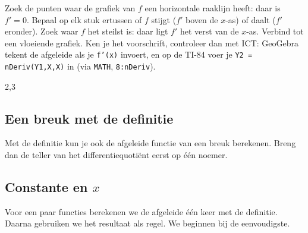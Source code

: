 \begin{werkwijze}
Zoek de punten waar de grafiek van $f$ een horizontale raaklijn heeft: daar is $f' = 0$. Bepaal op elk stuk ertussen of $f$ stijgt ($f'$ boven de $x$-as) of daalt ($f'$ eronder). Zoek waar $f$ het steilst is: daar ligt $f'$ het verst van de $x$-as. Verbind tot een vloeiende grafiek. Ken je het voorschrift, controleer dan met ICT: GeoGebra tekent de afgeleide als je \texttt{f'(x)} invoert, en op de TI-84 voer je \texttt{Y2 = nDeriv(Y1,X,X)} in (via \texttt{MATH}, \texttt{8:nDeriv}).
\end{werkwijze}

\begin{oefeningen}
\end{oefeningen}
\begin{alleenvoor}{2,3}

\subsection{Een breuk met de definitie}

Met de definitie kun je ook de afgeleide functie van een breuk berekenen. Breng dan de teller van het differentiequotiënt eerst op één noemer.


\begin{oefeningen}
\end{oefeningen}

\subsection{Constante en \texorpdfstring{$x$}{x}}

Voor een paar functies berekenen we de afgeleide één keer met de definitie. Daarna gebruiken we het resultaat als regel. We beginnen bij de eenvoudigste.


\end{alleenvoor}
